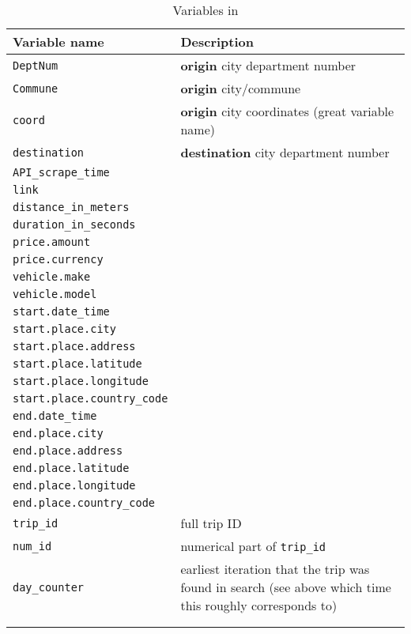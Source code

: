 \documentclass[11pt,a4paper]{article}
\begin{document}
\begin{longtable}{p{}p{}}
	\textbf{Variable name}				& \textbf{Description} 					\\\hline\hline
	\verb|DeptNum|						& \textbf{origin} city department number		\\
	\verb|Commune|						& \textbf{origin} city/commune		\\
	\verb|coord|						& \textbf{origin} city coordinates (great variable name)		\\
	\verb|destination|					& \textbf{destination} city department number		\\\hline
	\verb|API_scrape_time|				& 		\\\hline
	\verb|link|							& 		\\
	\verb|distance_in_meters|			& 		\\
	\verb|duration_in_seconds|			& 		\\
	\verb|price.amount|					& 		\\
	\verb|price.currency|				& 		\\
	\verb|vehicle.make|					& 		\\
	\verb|vehicle.model|				& 		\\\hline
	\verb|start.date_time|				& 		\\
	\verb|start.place.city|				& 		\\
	\verb|start.place.address|			& 		\\
	\verb|start.place.latitude|			& 		\\
	\verb|start.place.longitude|		& 		\\
	\verb|start.place.country_code|		& 		\\\hline
	\verb|end.date_time|				& 		\\
	\verb|end.place.city|				& 		\\
	\verb|end.place.address|			& 		\\
	\verb|end.place.latitude|			& 		\\
	\verb|end.place.longitude|			& 		\\
	\verb|end.place.country_code|		& 		\\
	\verb|trip_id|						& full trip ID		\\\hline
	\verb|num_id|						& numerical part of \verb|trip_id|		\\
	\verb|day_counter|					& earliest iteration that the trip was found in search (see above which time this roughly corresponds to)	\\\hline \\
\caption{Variables in}
\end{longtable}
\end{document}
